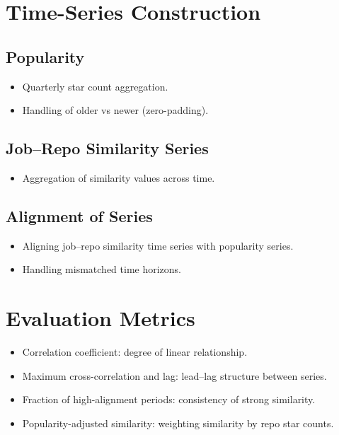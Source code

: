 
\section{Time-Series Construction}
\subsection{\repo{} Popularity}
\begin{itemize}
    \item Quarterly star count aggregation.
    \item Handling of older vs newer \repos{} (zero-padding).
\end{itemize}

\subsection{Job–Repo Similarity Series}
\begin{itemize}
    \item Aggregation of similarity values across time.
\end{itemize}

\subsection{Alignment of Series}
\begin{itemize}
    \item Aligning job–repo similarity time series with \repo{} popularity series.
    \item Handling mismatched time horizons.
\end{itemize}

\section{Evaluation Metrics}

\begin{itemize}
    \item Correlation coefficient: degree of linear relationship.
    \item Maximum cross-correlation and lag: lead–lag structure between series.
    \item Fraction of high-alignment periods: consistency of strong similarity.
    \item Popularity-adjusted similarity: weighting similarity by repo star counts.
\end{itemize}


